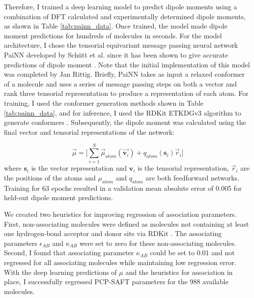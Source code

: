 Therefore, I trained a deep learning model to predict dipole moments using a combination of DFT calculated and experimentally determined dipole moments, as shown in Table \ref{tab:painn_data}.  Once trained, the model made dipole moment predictions for hundreds of molecules in seconds. For the model architecture, I chose the tensorial equivariant message passing neural network PaiNN developed by Schütt et al. since it has been shown to give accurate predictions of dipole moment \cite{Schutt2021}. Note that the initial implementation of this model was completed by Jan Rittig. Briefly, PaiNN takes as input a relaxed conformer of a molecule and uses a series of message passing steps on both a vector and rank three tensorial representation to produce a representation of each atom. For training, I used the conformer generation methods shown in Table \ref{tab:painn_data}, and for inference, I used the RDKit ETKDGv3 algorithm to generate conformers \cite{Wang2020}. Subsequently, the dipole moment was calculated using the final vector and tensorial representations of the network:

\begin{equation}
    \vec \mu = \biggl [\sum_{i=1}^N \vec \mu_{atom}(\vec{\mathbf v_i}) + q_{atom}(\mathbf s_i)\vec r_i \biggr ]
\end{equation}
where $\mathbf s_i$ is the vector representation and $\mathbf v_i$ is the tensorial representation, $\vec r_i$ are the positions of the atoms and $\mu_{atom}$ and $q_{atom}$ are both feedforward networks. Training for 63 epochs resulted in a validation mean absolute error of 0.005 for held-out dipole moment predictions.

We created two heuristics for improving regression of association parameters. First, non-associating molecules were defined as molecules not containing at least one hydrogen-bond acceptor and donor site via RDKit \cite{rdkit}. The associating parameters $\epsilon_{AB}$ and $\kappa_{AB}$ were set to zero for these non-associating molecules. Second, I found that associating parameter $\kappa_{AB}$ could be set to 0.01 and not regressed for all associating molecules while maintaining low regression error. With the deep learning predictions of $\mu$ and the heuristics for association in place, I successfully regressed PCP-SAFT parameters for the 988 available molecules. 

